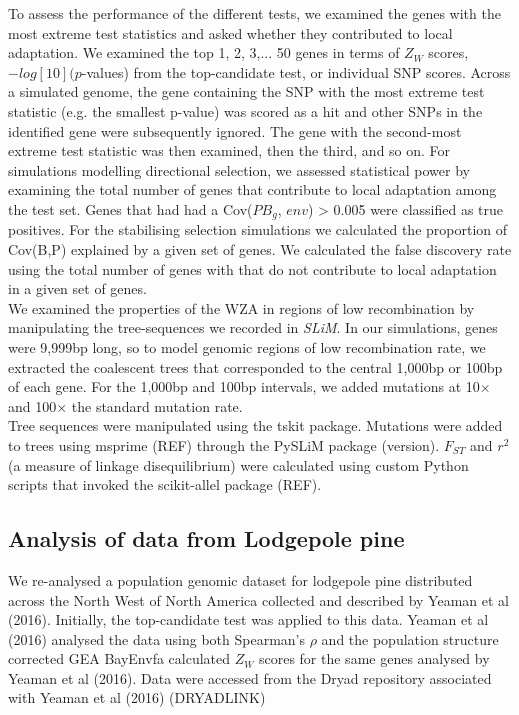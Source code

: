 \documentclass[10pt,twoside,lineno, twocolumn]{GSA_format}
\begin{document}
To assess the performance of the different tests, we examined the genes with the most extreme test statistics and asked whether they contributed to local adaptation. We examined the top 1, 2, 3,... 50 genes in terms of $Z_W$ scores, $-log[10](p$-values) from the top-candidate test, or individual SNP scores. Across a simulated genome, the gene containing the SNP with the most extreme test statistic (e.g. the smallest p-value) was scored as a hit and other SNPs in the identified gene were subsequently ignored. The gene with the second-most extreme test statistic was then examined, then the third, and so on. For simulations modelling directional selection, we assessed statistical power by examining the total number of genes that contribute to local adaptation among the test set. Genes that had had a Cov($PB_g$, $env$) > 0.005 were classified as true positives. For the stabilising selection simulations we calculated the proportion of Cov(B,P) explained by a given set of genes. We calculated the false discovery rate using the total number of genes with that do not contribute to local adaptation in a given set of genes. \\

We examined the properties of the WZA in regions of low recombination by manipulating the tree-sequences we recorded in \textit{SLiM}. In our simulations, genes were 9,999bp long, so to model genomic regions of low recombination rate, we extracted the coalescent trees that corresponded to the central 1,000bp or 100bp of each gene. For the 1,000bp and 100bp intervals, we added mutations at 10$\times$ and 100$\times$ the standard mutation rate. \\

Tree sequences were manipulated using the tskit package. Mutations were added to trees using msprime (REF) through the PySLiM package (version). $F_{ST}$ and $r^2$ (a measure of linkage disequilibrium) were calculated using custom Python scripts that invoked the scikit-allel package (REF).\\


\subsection{Analysis of data from Lodgepole pine}

We re-analysed a population genomic dataset for lodgepole pine distributed across the North West of North America collected and described by Yeaman et al (2016). Initially, the top-candidate test was applied to this data. Yeaman et al (2016) analysed the data using both Spearman's $\rho$ and the population structure corrected GEA BayEnvfa
calculated $Z_W$ scores for the same genes analysed by Yeaman et al (2016). Data were accessed from the Dryad repository associated with Yeaman et al (2016) (DRYADLINK)
\end{document}
